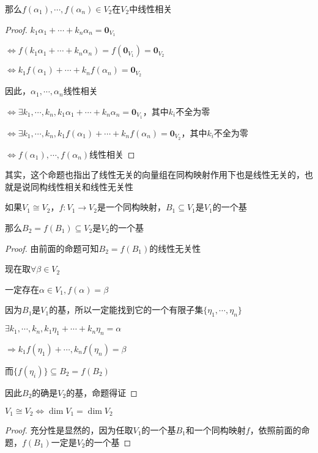 \documentclass[12pt, a4paper, oneside, UTF8]{ctexbook}
\begin{document}
\begin{para}{0}
\begin{proposition}
						那么$f(\alpha_1),\cdots,f(\alpha_n) \in V_2$在$V_2$中线性相关
					\end{proposition}
					\begin{proof}
						$k_1 \alpha_1 + \cdots + k_n \alpha_n = \mathbf{0}_{V_1}$

						$\Leftrightarrow f(k_1 \alpha_1 + \cdots + k_n \alpha_n) = f(\mathbf{0}_{V_1})=\mathbf{0}_{V_2}$

						$\Leftrightarrow k_1f(\alpha_1) + \cdots + k_nf(\alpha_n) = \mathbf{0}_{V_2}$

						因此，$\alpha_1,\cdots,\alpha_n$线性相关

						$\Leftrightarrow \exists k_1,\cdots,k_n,k_1 \alpha_1 + \cdots + k_n \alpha_n = \mathbf{0}_{V_1}$，其中$k_i$不全为零

						$\Leftrightarrow \exists k_1,\cdots,k_n,k_1 f(\alpha_1) + \cdots + k_n f(\alpha_n) = \mathbf{0}_{V_2}$，其中$k_i$不全为零
					
						$\Leftrightarrow f(\alpha_1),\cdots,f(\alpha_n)$线性相关
					\end{proof}
					其实，这个命题也指出了线性无关的向量组在同构映射作用下也是线性无关的，也就是说同构线性相关和线性无关性
				\point{}
					\begin{proposition}
						如果$V_1 \cong V_2$，$f:V_1 \to V_2$是一个同构映射，$B_1 \subseteq V_1$是$V_1$的一个基

						那么$B_2 = f(B_1) \subseteq V_2$是$V_2$的一个基
					\end{proposition}
					\begin{proof}
						由前面的命题可知$B_2=f(B_1)$的线性无关性

						现在取$\forall \beta \in V_2$

						一定存在$\alpha \in V_1,f(\alpha )=\beta $

						因为$B_1$是$V_1$的基，所以一定能找到它的一个有限子集$\{\eta_1,\cdots,\eta_n\}$

						$\exists k_1,\cdots,k_n ,k_1 \eta_1 +\cdots + k_n \eta_n = \alpha $

						$\Rightarrow k_1 f(\eta_1) + \cdots, k_n f(\eta_n) = \beta $

						而$\{f(\eta_i)\} \subseteq B_2 = f(B_2)$

						因此$B_2$的确是$V_2$的基，命题得证
					\end{proof}
				\point{}
					\begin{proposition}
						$V_1 \cong V_2 \Leftrightarrow \dim V_1  = \dim V_2$
					\end{proposition}
					\begin{proof}
						充分性是显然的，因为任取$V_1$的一个基$B_1$和一个同构映射$f$，依照前面的命题，$f(B_1)$一定是$V_2$的一个基


\end{proof}
\end{para}
\end{document}
